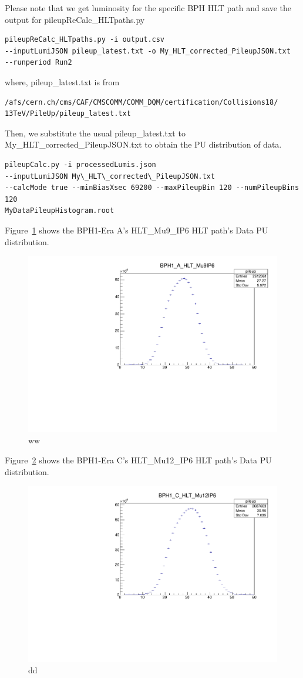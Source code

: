 Please note that we get luminosity for the specific BPH HLT path and save the output for pileupReCalc\_HLTpaths.py

\begin{verbatim}
pileupReCalc_HLTpaths.py -i output.csv 
--inputLumiJSON pileup_latest.txt -o My_HLT_corrected_PileupJSON.txt 
--runperiod Run2
\end{verbatim}

where, pileup\_latest.txt is from

\begin{verbatim}
/afs/cern.ch/cms/CAF/CMSCOMM/COMM_DQM/certification/Collisions18/
13TeV/PileUp/pileup_latest.txt
\end{verbatim}


Then, we substitute the usual pileup\_latest.txt to My\_HLT\_corrected\_PileupJSON.txt to obtain the PU distribution of data. 

\begin{verbatim}
pileupCalc.py -i processedLumis.json 
--inputLumiJSON My\_HLT\_corrected\_PileupJSON.txt  
--calcMode true --minBiasXsec 69200 --maxPileupBin 120 --numPileupBins 120 
MyDataPileupHistogram.root
\end{verbatim}

Figure~\ref{fig:EraAData} shows the BPH1-Era A's HLT\_Mu9\_IP6 HLT path's Data PU distribution.
\begin{figure}[h!]
  \caption{ww}
  \label{fig:EraAData}
  \centering
  \includegraphics[width=0.67\linewidth]{figs/BPH1AData.pdf}

\end{figure}

Figure~\ref{fig:EraCData} shows the BPH1-Era C's HLT\_Mu12\_IP6 HLT path's Data PU distribution.
\begin{figure}[h!]
  \caption{dd}
  \label{fig:EraCData}
  \centering
  \includegraphics[width=0.67\linewidth]{figs/BPH1CData.pdf}

\end{figure}

